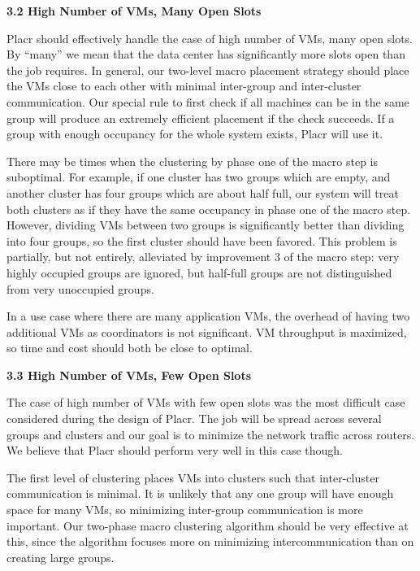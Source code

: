 \documentclass[11pt]{article}
\begin{document}
\Large{\textbf{3.2 High Number of VMs, Many Open Slots}}

\normalsize

Placr should effectively handle the case of high number of VMs, many open slots.  By “many” we mean that the data center has significantly more slots open than the job requires. In general, our two-level macro placement strategy should place the VMs close to each other with minimal inter-group and inter-cluster communication.  Our special rule to first check if all machines can be in the same group will produce an extremely efficient placement if the check succeeds.  If a group with enough occupancy for the whole system exists, Placr will use it.

There may be times when the clustering by phase one of the macro step is suboptimal. For example, if one cluster has two groups which are empty, and another cluster has four groups which are about half full, our system will treat both clusters as if they have the same occupancy in phase one of the macro step. However, dividing VMs between two groups is significantly better than dividing into four groups, so the first cluster should have been favored. This problem is partially, but not entirely, alleviated by improvement 3 of the macro step: very highly occupied groups are ignored, but half-full groups are not distinguished from very unoccupied groups.

In a use case where there are many application VMs, the overhead of having two additional VMs as coordinators is not significant.  VM throughput is maximized, so time and cost should both be close to optimal.


\Large{\textbf{3.3 High Number of VMs, Few Open Slots}}
\normalsize

The case of high number of VMs with few open slots was the most difficult case considered during the design of Placr.  The job will be spread across several groups and clusters and our goal is to minimize the network traffic across routers.  We believe that Placr should perform very well in this case though.

The first level of clustering places VMs into clusters such that inter-cluster communication is minimal.  It is unlikely that any one group will have enough space for many VMs, so minimizing inter-group communication is more important.  Our two-phase macro clustering algorithm should be very effective at this, since the algorithm focuses more on minimizing intercommunication than on creating large groups.
\end{document}
